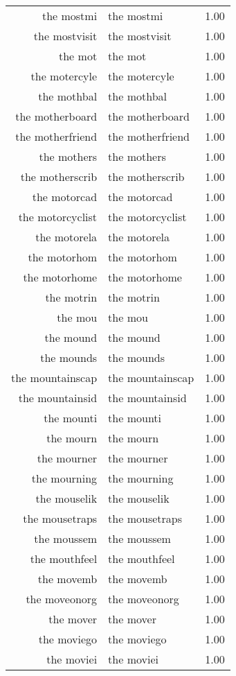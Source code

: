 \begin{table}[ht]
\begin{tabular}{rlr}
  the mostmi & the mostmi & 1.00 \\ 
  the mostvisit & the mostvisit & 1.00 \\ 
  the mot & the mot & 1.00 \\ 
  the motercyle & the motercyle & 1.00 \\ 
  the mothbal & the mothbal & 1.00 \\ 
  the motherboard & the motherboard & 1.00 \\ 
  the motherfriend & the motherfriend & 1.00 \\ 
  the mothers & the mothers & 1.00 \\ 
  the motherscrib & the motherscrib & 1.00 \\ 
  the motorcad & the motorcad & 1.00 \\ 
  the motorcyclist & the motorcyclist & 1.00 \\ 
  the motorela & the motorela & 1.00 \\ 
  the motorhom & the motorhom & 1.00 \\ 
  the motorhome & the motorhome & 1.00 \\ 
  the motrin & the motrin & 1.00 \\ 
  the mou & the mou & 1.00 \\ 
  the mound & the mound & 1.00 \\ 
  the mounds & the mounds & 1.00 \\ 
  the mountainscap & the mountainscap & 1.00 \\ 
  the mountainsid & the mountainsid & 1.00 \\ 
  the mounti & the mounti & 1.00 \\ 
  the mourn & the mourn & 1.00 \\ 
  the mourner & the mourner & 1.00 \\ 
  the mourning & the mourning & 1.00 \\ 
  the mouselik & the mouselik & 1.00 \\ 
  the mousetraps & the mousetraps & 1.00 \\ 
  the moussem & the moussem & 1.00 \\ 
  the mouthfeel & the mouthfeel & 1.00 \\ 
  the movemb & the movemb & 1.00 \\ 
  the moveonorg & the moveonorg & 1.00 \\ 
  the mover & the mover & 1.00 \\ 
  the moviego & the moviego & 1.00 \\ 
  the moviei & the moviei & 1.00 \\ 

\end{tabular}
\end{table}
